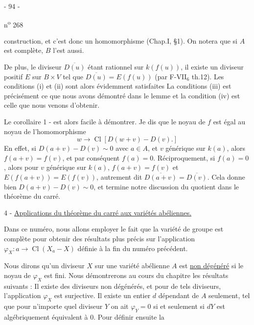 \begin{center}- 94 -\end{center}\hfill n\textsuperscript{o} 268

construction, et c'est donc un homomorphisme (Chap.I, \S 1). On notera que si $A$ est complète, $B$ l'est aussi.

De plus, le diviseur $\overline{D(u)}$ étant rationnel sur $k(f(u))$, il existe un diviseur positif $E$ sur $B\times V$ tel que $\overline{D(u)}=E(f(u))$ (par F-VII$_6$ th.12). Les conditions (i) et (ii) sont alors évidemment satisfaites La conditions (iii) est précisément ce que nous avons démontré dans le lemme et la condition (iv) est celle que nous venons d'obtenir.

Le corollaire 1 - est alors facile à démontrer. Je dis que le noyau de $f$ est égal au noyau de l'homomorphisme
\[
w\longrightarrow\operatorname{Cl}[D(w+v)-D(v).]
\]
En effet, si $D(a+v)-D(v)\sim0$ avec $a\in A$, et $v$ générique sur $k(a)$, alors $f(a+v)=f(v)$, et par conséquent $f(a)=0$. Réciproquement, si $f(a)=0$, alors pour $v$ générique sur $k(a)$, $f(a+v)=f(v)$ et $E(f(a+v))=E(f(v))$, autrement dit $\overline{D(a+v)}=\overline{D(v)}$. Cela donne bien $D(a+v)-D(v)\sim0$, et termine notre discussion du quotient dans le théorème du carré.

4 - \uline{Applications du théorème du carré aux variétés abéliennes.}

Dans ce numéro, nous allons employer le fait que la variété de groupe est complète pour obtenir des résultats plus précis sur l'application $\varphi_X:a\longrightarrow\operatorname{Cl}(X_a-X)$ définie à la fin du numéro précédent.

Nous dirons qu'un diviseur $X$ sur une variété abélienne $A$ est \uline{non dégénéré} si le noyau de $\varphi_X$ est fini. Nous démontrerons au cours du chapitre les résultats suivants : Il existe des diviseurs non dégénérés, et pour de tels diviseurs, l'application $\varphi_X$ est surjective. Il existe un entier $d$ dépendant de $A$ seulement, tel que pour n'importe quel diviseur $Y$ on ait $\varphi_Y=0$ si et seulement si $dY$ est algébriquement équivalent à $0$. Pour définir ensuite la
